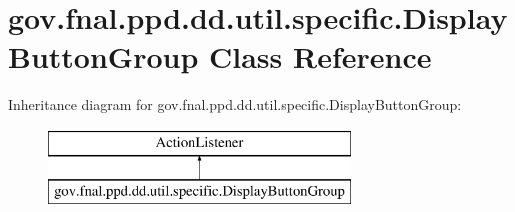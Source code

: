 \hypertarget{classgov_1_1fnal_1_1ppd_1_1dd_1_1util_1_1specific_1_1DisplayButtonGroup}{\section{gov.\-fnal.\-ppd.\-dd.\-util.\-specific.\-Display\-Button\-Group Class Reference}
\label{classgov_1_1fnal_1_1ppd_1_1dd_1_1util_1_1specific_1_1DisplayButtonGroup}
}
Inheritance diagram for gov.\-fnal.\-ppd.\-dd.\-util.\-specific.\-Display\-Button\-Group\-:\begin{figure}[H]
\begin{center}
\leavevmode
\includegraphics[height=2.000000cm]{classgov_1_1fnal_1_1ppd_1_1dd_1_1util_1_1specific_1_1DisplayButtonGroup}
\end{center}
\end{figure}
